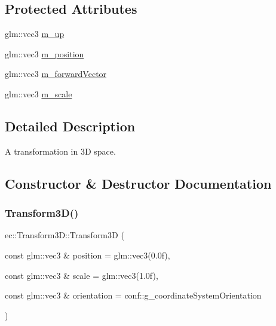 \subsection*{Protected Attributes}
\begin{DoxyCompactItemize}
\item 
glm\+::vec3 \mbox{\hyperlink{classec_1_1_transform3_d_addd1132fb57befe841dfd9af94aa4329}{m\+\_\+up}}
\item 
glm\+::vec3 \mbox{\hyperlink{classec_1_1_transform3_d_a5bba8c29bb22d2b122b64b51b52335f7}{m\+\_\+position}}
\item 
glm\+::vec3 \mbox{\hyperlink{classec_1_1_transform3_d_a5d7ebb5dc842dc73fe0840f3e3f95ab8}{m\+\_\+forward\+Vector}}
\item 
glm\+::vec3 \mbox{\hyperlink{classec_1_1_transform3_d_a8eb8cecaa5ec8273e49c9487e0f6b935}{m\+\_\+scale}}
\end{DoxyCompactItemize}


\subsection{Detailed Description}
A transformation in 3D space. 

\subsection{Constructor \& Destructor Documentation}
\mbox{\label{classec_1_1_transform3_d_adb5c661621922b1a3a6e6433ce1c79f6}} 
\subsubsection{\texorpdfstring{Transform3\+D()}{Transform3D()}}
{\footnotesize\ttfamily ec\+::\+Transform3\+D\+::\+Transform3D (\begin{DoxyParamCaption}\item[{const glm\+::vec3 \&}]{position = {\ttfamily glm\+:\+:vec3(0.0f)},  }\item[{const glm\+::vec3 \&}]{scale = {\ttfamily glm\+:\+:vec3(1.0f)},  }\item[{const glm\+::vec3 \&}]{orientation = {\ttfamily conf\+:\+:g\+\_\+coordinateSystemOrientation} }\end{DoxyParamCaption})\hspace{0.3cm}{\ttfamily [explicit]}}

